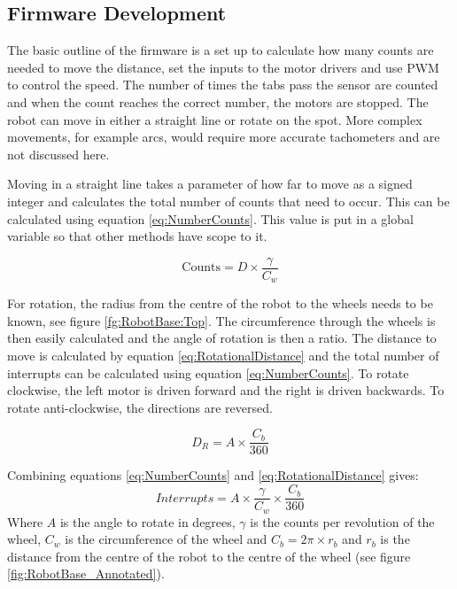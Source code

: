 \subsection{Firmware Development}

The basic outline of the firmware is a set up to calculate how many counts are needed to move the distance, set the inputs to the motor drivers and use PWM to control the speed. The number of times the tabs pass the sensor are counted and when the count reaches the correct number, the motors are stopped. The robot can move in either a straight line or rotate on the spot. More complex movements, for example arcs, would require more accurate tachometers and are not discussed here. 

Moving in a straight line takes a parameter of how far to move as a signed integer and calculates the total number of counts that need to occur. This can be calculated using equation \eqref{eq:NumberCounts}. This value is put in a global variable so that other methods have scope to it. 

\begin{equation}
\label{eq:NumberCounts}
\text{Counts} = D \times \frac{\gamma}{C_w}
\end{equation}

For rotation, the radius from the centre of the robot to the wheels needs to be known, see figure \ref{fg:RobotBase:Top}. The circumference through the wheels is then easily calculated and the angle of rotation is then a ratio. The distance to move is calculated by equation \eqref{eq:RotationalDistance} and the total number of interrupts can be calculated using equation \eqref{eq:NumberCounts}. To rotate clockwise, the left motor is driven forward and the right is driven backwards. To rotate anti-clockwise, the directions are reversed.

\begin{equation}
\label{eq:RotationalDistance}
D_{R} = A \times \frac{C_b}{360}
\end{equation}

Combining equations \eqref{eq:NumberCounts} and \eqref{eq:RotationalDistance} gives:
\begin{equation}
\label{eq:RotationalInterrupts}
Interrupts = A \times \frac{\gamma}{C_w} \times \frac{C_b}{360}
\end{equation}
Where $A$ is the angle to rotate in degrees, $\gamma$ is the counts per revolution of the wheel, $C_w$ is the circumference of the wheel and $C_b = 2\pi\times r_b$ and $r_b$ is the distance from the centre of the robot to the centre of the wheel (see figure \ref{fig:RobotBase_Annotated}).


